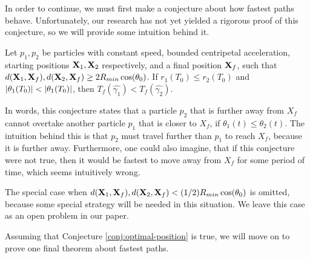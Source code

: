 In order to continue, we must first make a conjecture about how fastest paths behave. Unfortunately, our research has not yet yielded a rigorous proof of this conjecture, so we will provide some intuition behind it.

\begin{conjecture}\label{conj:optimal-position}
  Let $p_1, p_2$ be particles with constant speed, bounded centripetal acceleration, starting positions $\mathbf{X}_1, \mathbf{X}_2$ respectively, and a final position $\mathbf{X}_f$, such that $d(\bvec{X}_1, \bvec{X}_f), d(\bvec{X}_2, \bvec{X}_f) \ge 2 R_{min} \cos\paren{\theta_0}$. If $r_1(T_0) \leq r_2(T_0)$ and $\abs{\theta_1(T_0)} < \abs{\theta_1(T_0)}$, then $T_f(\hat{\gamma_1}) < T_f(\hat{\gamma_2})$.
\end{conjecture}

In words, this conjecture states that a particle $p_2$ that is further away from $X_f$ cannot overtake another particle $p_1$ that is closer to $X_f$, if $\theta_1(t) \le \theta_2(t)$. The intuition behind this is that $p_2$ must travel further than $p_1$ to reach $X_f$, because it is further away. Furthermore, one could also imagine, that if this conjecture were not true, then it would be fastest to move away from $X_f$ for some period of time, which seems intuitively wrong.

The special case when $d(\bvec{X}_1, \bvec{X}_f), d(\bvec{X}_2, \bvec{X}_f) < (1/2) R_{min} \cos\paren{\theta_0}$ is omitted, because some special strategy will be needed in this situation. We leave this case as an open problem in our paper. 

Assuming that Conjecture \ref{conj:optimal-position} is true, we will move on to prove one final theorem about fastest paths.


